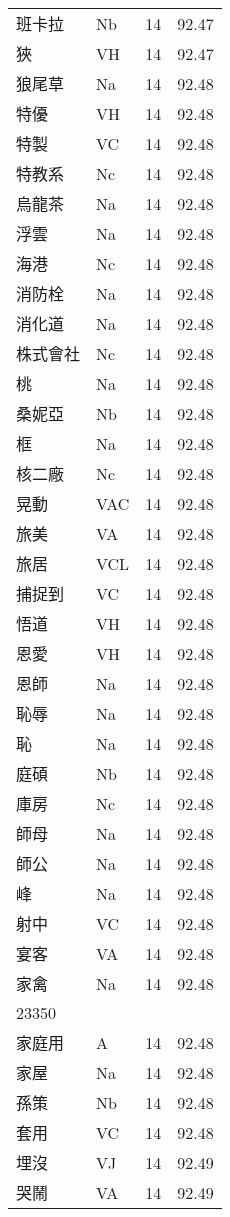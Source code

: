 \documentclass[twocolumn]{book}
\begin{document}
\begin{supertabular}{llrr}
班卡拉 & Nb & 14 &  92.47\\
狹 & VH & 14 &  92.47\\
狼尾草 & Na & 14 &  92.48\\
特優 & VH & 14 &  92.48\\
特製 & VC & 14 &  92.48\\
特教系 & Nc & 14 &  92.48\\
烏龍茶 & Na & 14 &  92.48\\
浮雲 & Na & 14 &  92.48\\
海港 & Nc & 14 &  92.48\\
消防栓 & Na & 14 &  92.48\\
消化道 & Na & 14 &  92.48\\
株式會社 & Nc & 14 &  92.48\\
桃 & Na & 14 &  92.48\\
桑妮亞 & Nb & 14 &  92.48\\
框 & Na & 14 &  92.48\\
核二廠 & Nc & 14 &  92.48\\
晃動 & VAC & 14 &  92.48\\
旅美 & VA & 14 &  92.48\\
旅居 & VCL & 14 &  92.48\\
捕捉到 & VC & 14 &  92.48\\
悟道 & VH & 14 &  92.48\\
恩愛 & VH & 14 &  92.48\\
恩師 & Na & 14 &  92.48\\
恥辱 & Na & 14 &  92.48\\
恥 & Na & 14 &  92.48\\
庭碩 & Nb & 14 &  92.48\\
庫房 & Nc & 14 &  92.48\\
師母 & Na & 14 &  92.48\\
師公 & Na & 14 &  92.48\\
峰 & Na & 14 &  92.48\\
射中 & VC & 14 &  92.48\\
宴客 & VA & 14 &  92.48\\
家禽 & Na & 14 &  92.48\\
23350\\
家庭用 & A & 14 &  92.48\\
家屋 & Na & 14 &  92.48\\
孫策 & Nb & 14 &  92.48\\
套用 & VC & 14 &  92.48\\
埋沒 & VJ & 14 &  92.49\\
哭鬧 & VA & 14 &  92.49\\

\end{supertabular}
\end{document}
